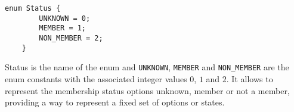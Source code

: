 \documentclass[../MasterThesis.tex]{subfiles}
\begin{document}
\begin{description}[font=\normalfont\color{RedViolet!80!black}, style=nextline]
\begin{lstlisting}[style=protobufStyle, numbers=none]
	enum Status {
		UNKNOWN = 0;
		MEMBER = 1;
		NON_MEMBER = 2;
	}
\end{lstlisting}

Status is the name of the enum and \texttt{UNKNOWN}, \texttt{MEMBER} and \texttt{NON\_MEMBER} are the enum constants with the associated integer values $0$, $1$ and $2$.
It allows to represent the membership status options unknown, member or not a member, providing a way to represent a fixed set of options or states.



\end{description}


	
\end{document}
